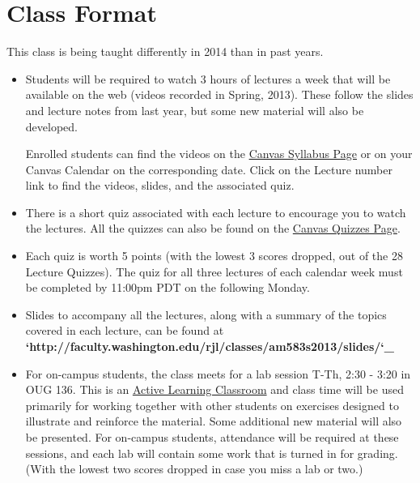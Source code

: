 \documentclass[letterpaper,10pt,english]{sphinxmanual}
\begin{document}
\section{Class Format}
\label{class_format:class-format}\label{class_format::doc}\label{class_format:id1}
This class is being taught differently in 2014 than in past years.
\begin{itemize}
\item {} 
Students will be required to watch 3 hours of lectures a week that will be
available on the web (videos recorded in Spring, 2013). These follow the
slides and lecture notes from last year, but some new material will also be
developed.

Enrolled students can find the videos on the
\href{https://canvas.uw.edu/courses/893991/assignments/syllabus}{Canvas Syllabus Page} or on
your Canvas Calendar on the corresponding date.  Click on the Lecture
number link to find the videos, slides, and the associated quiz.

\item {} 
There is a short quiz associated with each lecture to encourage you
to watch the lectures.
All the quizzes can also be found on the \href{https://canvas.uw.edu/courses/893991/quizzes}{Canvas Quizzes Page}.

\item {} 
Each quiz is worth 5 points (with the lowest 3
scores dropped, out of the 28 Lecture Quizzes).
The quiz for all three lectures of each calendar week must be completed
by 11:00pm PDT on the following Monday.

\item {} 
Slides to accompany all the lectures, along with a summary of the topics
covered in each lecture, can be found at
{\color{red}\bfseries{}{}`http://faculty.washington.edu/rjl/classes/am583s2013/slides/{}`\_}

\item {} 
For on-campus students, the class meets for a lab session
T-Th, 2:30 - 3:20 in OUG 136. This
is an \href{http://www.lib.washington.edu/ougl/learning-spaces/active-learning-classrooms}{Active Learning Classroom}
and class time will be used primarily for
working together with other students on exercises designed to illustrate and
reinforce the material. Some additional new material will also be presented.
For on-campus students, attendance will be required at these sessions,
and each lab will contain some work that is turned in for grading.
(With the lowest two scores dropped in case you miss a lab or two.)


\end{itemize}
\end{document}
